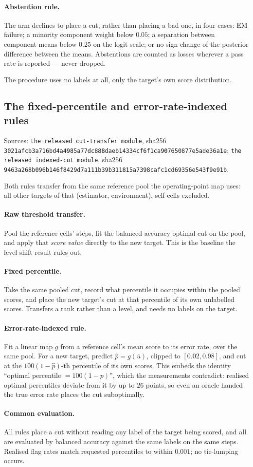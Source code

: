 \paragraph{Abstention rule.} The arm declines to place a cut, rather than placing
a bad one, in four cases: EM failure; a minority component weight below $0.05$; a
separation between component means below $0.25$ on the logit scale; or no sign
change of the posterior difference between the means. Abstentions are counted as
losses wherever a pass rate is reported --- never dropped.

The procedure uses no labels at all, only the target's own score distribution.

\subsection{The fixed-percentile and error-rate-indexed rules}
\label{app:methods:simplerules}

Sources: \texttt{the released cut-transfer module}, sha256
\texttt{3021afcb3a716bd4a4985a77dc888daeb14334cf6f1ca907650877e5ade36a1e};
\texttt{the released indexed-cut module}, sha256
\texttt{9463a268b096b146f8429d7a111b39b311815a7398cafc1cd69356e543f9e91b}.

Both rules transfer from the same reference pool the operating-point map uses: all
other targets of that (estimator, environment), self-cells excluded.

\paragraph{Raw threshold transfer.} Pool the reference cells' steps, fit the
balanced-accuracy-optimal cut on the pool, and apply that \emph{score value}
directly to the new target. This is the baseline the level-shift result rules out.

\paragraph{Fixed percentile.} Take the same pooled cut, record what percentile it
occupies within the pooled scores, and place the new target's cut at that
percentile of its own unlabelled scores. Transfers a rank rather than a level, and
needs no labels on the target.

\paragraph{Error-rate-indexed rule.} Fit a linear map $g$ from a reference cell's
mean score to its error rate, over the same pool. For a new target, predict
$\hat{p} = g(\bar{u})$, clipped to $[0.02, 0.98]$, and cut at the
$100(1-\hat{p})$-th percentile of its own scores. This embeds the identity
``optimal percentile $= 100(1-p)$'', which the measurements contradict: realised
optimal percentiles deviate from it by up to $26$ points, so even an oracle handed
the true error rate places the cut suboptimally.

\paragraph{Common evaluation.} All rules place a cut without reading any label of
the target being scored, and all are evaluated by balanced accuracy against the
same labels on the same steps. Realised flag rates match requested percentiles to
within $0.001$; no tie-lumping occurs.

